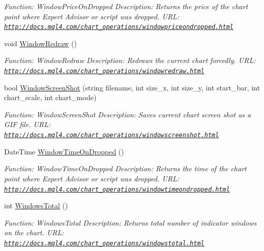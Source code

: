 \begin{DoxyCompactItemize}
\begin{DoxyCompactList}\small\item\em Function\+: Window\+Price\+On\+Dropped Description\+: Returns the price of the chart point where Expert Advisor or script was dropped. U\+RL\+: \href{http://docs.mql4.com/chart_operations/windowpriceondropped.html}{\tt http\+://docs.\+mql4.\+com/chart\+\_\+operations/windowpriceondropped.\+html} \end{DoxyCompactList}\item 
void \hyperlink{class_m_q_l4_c_sharp_1_1_base_1_1_m_q_l_base_a19a9633c3ebd59dd8c7e4ab98607059d}{Window\+Redraw} ()
\begin{DoxyCompactList}\small\item\em Function\+: Window\+Redraw Description\+: Redraws the current chart forcedly. U\+RL\+: \href{http://docs.mql4.com/chart_operations/windowredraw.html}{\tt http\+://docs.\+mql4.\+com/chart\+\_\+operations/windowredraw.\+html} \end{DoxyCompactList}\item 
bool \hyperlink{class_m_q_l4_c_sharp_1_1_base_1_1_m_q_l_base_a82a4afc1317b32a3495eead5840d1fed}{Window\+Screen\+Shot} (string filename, int size\+\_\+x, int size\+\_\+y, int start\+\_\+bar, int chart\+\_\+scale, int chart\+\_\+mode)
\begin{DoxyCompactList}\small\item\em Function\+: Window\+Screen\+Shot Description\+: Saves current chart screen shot as a G\+IF file. U\+RL\+: \href{http://docs.mql4.com/chart_operations/windowscreenshot.html}{\tt http\+://docs.\+mql4.\+com/chart\+\_\+operations/windowscreenshot.\+html} \end{DoxyCompactList}\item 
Date\+Time \hyperlink{class_m_q_l4_c_sharp_1_1_base_1_1_m_q_l_base_a28b660fd45998a1e6cfeaec2caa5f67a}{Window\+Time\+On\+Dropped} ()
\begin{DoxyCompactList}\small\item\em Function\+: Window\+Time\+On\+Dropped Description\+: Returns the time of the chart point where Expert Advisor or script was dropped. U\+RL\+: \href{http://docs.mql4.com/chart_operations/windowtimeondropped.html}{\tt http\+://docs.\+mql4.\+com/chart\+\_\+operations/windowtimeondropped.\+html} \end{DoxyCompactList}\item 
int \hyperlink{class_m_q_l4_c_sharp_1_1_base_1_1_m_q_l_base_a20999e4055161184647e3571f7df30a2}{Windows\+Total} ()
\begin{DoxyCompactList}\small\item\em Function\+: Windows\+Total Description\+: Returns total number of indicator windows on the chart. U\+RL\+: \href{http://docs.mql4.com/chart_operations/windowstotal.html}{\tt http\+://docs.\+mql4.\+com/chart\+\_\+operations/windowstotal.\+html} \end{DoxyCompactList}\item 

\end{DoxyCompactItemize}
